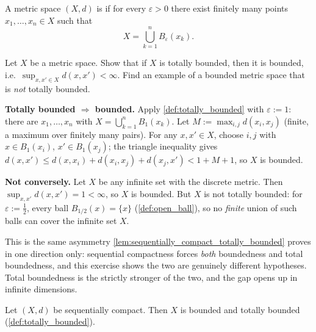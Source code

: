 \begin{definition}
\label{def:totally_bounded}
A metric space $(X,d)$ is   if for
every $\varepsilon > 0$ there exist finitely many points $x_1,\dots,x_n \in X$ such that
\[X = \bigcup_{k=1}^{n} B_\varepsilon(x_k).\]
\end{definition}

\begin{exercise}
\label{ex:totally_bounded_implies_bounded}
Let $X$ be a metric space. Show that if $X$ is totally bounded, then it is bounded, i.e.\
$\sup_{x,x'\in X}d(x,x') < \infty$. Find an example of a bounded metric space that is
\emph{not} totally bounded.
\end{exercise}

\begin{exercisesolution}
\textbf{Totally bounded $\Rightarrow$ bounded.} Apply \cref{def:totally_bounded} with
$\varepsilon := 1$: there are $x_1,\dots,x_n$ with $X = \bigcup_{k=1}^n B_1(x_k)$. Let
$M := \max_{i,j}d(x_i,x_j)$ (finite, a maximum over finitely many pairs). For any
$x,x' \in X$, choose $i,j$ with $x \in B_1(x_i)$, $x' \in B_1(x_j)$; the triangle inequality
gives $d(x,x') \leq d(x,x_i)+d(x_i,x_j)+d(x_j,x') < 1+M+1$, so $X$ is bounded.

\textbf{Not conversely.} Let $X$ be any infinite set with the discrete metric. Then
$\sup_{x,x'}d(x,x') = 1 < \infty$, so $X$ is bounded. But $X$ is not totally bounded: for
$\varepsilon := \tfrac12$, every ball $B_{1/2}(x) = \{x\}$ (\cref{def:open_ball}), so no
\emph{finite} union of such balls can cover the infinite set $X$.
\end{exercisesolution}

\begin{remark}
This is the same asymmetry \cref{lem:sequentially_compact_totally_bounded} proves in one
direction only: sequential compactness forces \emph{both} boundedness and total boundedness, and
this exercise shows the two are genuinely different hypotheses. Total boundedness is the strictly
stronger of the two, and the gap opens up in infinite dimensions.
\end{remark}

\begin{lemma}
\label{lem:sequentially_compact_totally_bounded}
Let $(X,d)$ be sequentially compact. Then $X$ is bounded and totally bounded
(\cref{def:totally_bounded}).
\end{lemma}

